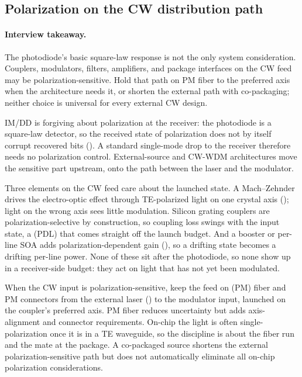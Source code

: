 \subsection{Polarization on the CW distribution path}
\label{sec:polarization}

\paragraph{Interview takeaway.}
The photodiode's basic square-law response is not the only system consideration.
Couplers, modulators, filters, amplifiers, and package interfaces on the CW feed
may be polarization-sensitive. Hold that path on PM fiber to the preferred axis
when the architecture needs it, or shorten the external path with co-packaging;
neither choice is universal for every external CW design.

IM/DD is forgiving about polarization at the receiver: the photodiode is a
square-law detector, so the received state of polarization does not by itself
corrupt recovered bits (). A standard single-mode
drop to the receiver therefore needs no polarization control. External-source
and CW-WDM architectures move the sensitive part upstream, onto the path between
the laser and the modulator.

 Three elements on the CW feed care about the launched
state. A  Mach--Zehnder drives the electro-optic effect through
TE-polarized light on one crystal axis (); light on the wrong
axis sees little modulation. Silicon grating couplers are polarization-selective by
construction, so coupling loss swings with the input state, a
 (PDL) that comes straight off the launch budget.
And a booster or per-line SOA adds polarization-dependent gain
(), so a drifting state becomes a drifting per-line
power. None of these sit after the photodiode, so none show up in a receiver-side
budget: they act on light that has not yet been modulated.

 When the CW input is polarization-sensitive, keep the
feed on  (PM) fiber and PM connectors from the
external laser () to the modulator input, launched on the
coupler's preferred axis. PM fiber reduces uncertainty but adds axis-alignment
and connector requirements. On-chip the light is often single-polarization once
it is in a TE waveguide, so the discipline is about the fiber run and the mate
at the package. A co-packaged source shortens the external polarization-sensitive
path but does not automatically eliminate all on-chip polarization
considerations.

